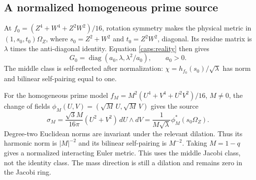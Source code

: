 \subsection{A normalized homogeneous prime source}
At $f_0=(Z^4+W^4+Z^2W^2)/16$, rotation symmetry makes the physical
metric in $(1,s_0,t_0)\Omega_Z$, where
$s_0=Z^2+W^2$ and $t_0=Z^2W^2$, diagonal. Its residue matrix is
$\lambda$ times the anti-diagonal identity. Equation
\eqref{caps:reality} then gives
\begin{equation}\label{caps:homogeneous}
G_0=\operatorname{diag}(a_0,\lambda,\lambda^2/a_0),
\qquad a_0>0.
\end{equation}
The middle class is self-reflected after normalization:
$\chi=h_{f_0}(s_0)/\sqrt\lambda$ has norm and bilinear self-pairing
equal to one.

For the homogeneous prime model
$f_M=M^2(U^4+V^4+U^2V^2)/16$, $M\ne0$, the change of fields
$\phi_M(U,V)=(\sqrt M\,U,\sqrt M\,V)$ gives the source
\begin{equation}\label{caps:prime-source}
\sigma_M=\frac{\sqrt3 M}{16\pi}(U^2+V^2)\,dU\wedge dV
 =\frac{1}{M\sqrt\lambda}\phi_M^*(s_0\Omega_Z).
\end{equation}
Degree-two Euclidean norms are invariant under the relevant
dilation. Thus its harmonic norm is $|M|^{-2}$ and its bilinear
self-pairing is $M^{-2}$. Taking $M=1-q$ gives a normalized
interacting Euler metric. This uses the middle Jacobi class,
not the identity class. The mass direction is still a dilation
and remains zero in the Jacobi ring.
